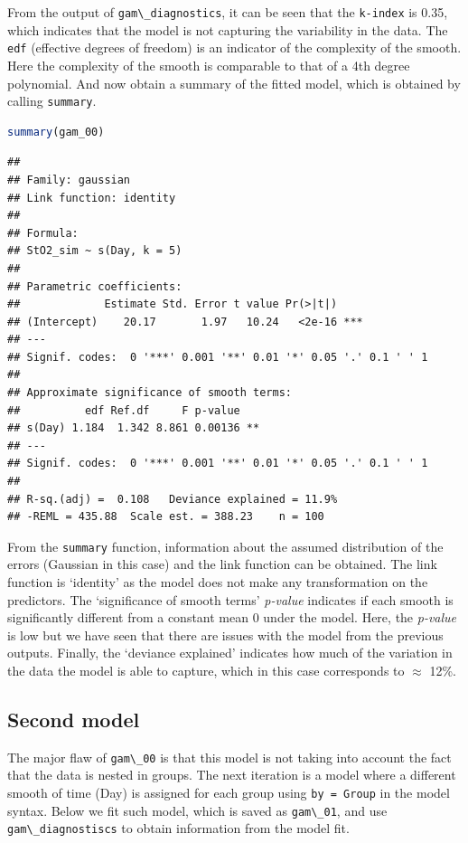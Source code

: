 \documentclass[
]{article}
\newcommand{\passthrough}[1]{#1}
\begin{document}
From the output of \passthrough{\lstinline!gam\_diagnostics!}, it can be seen that the \passthrough{\lstinline!k-index!} is 0.35, which indicates that the model is not capturing the variability in the data. The \passthrough{\lstinline!edf!} (effective degrees of freedom) is an indicator of the complexity of the smooth. Here the complexity of the smooth is comparable to that of a 4th degree polynomial. And now obtain a summary of the fitted model, which is obtained by calling \passthrough{\lstinline!summary!}.

\begin{lstlisting}[language=R]
summary(gam_00)
\end{lstlisting}

\begin{lstlisting}
## 
## Family: gaussian 
## Link function: identity 
## 
## Formula:
## StO2_sim ~ s(Day, k = 5)
## 
## Parametric coefficients:
##             Estimate Std. Error t value Pr(>|t|)    
## (Intercept)    20.17       1.97   10.24   <2e-16 ***
## ---
## Signif. codes:  0 '***' 0.001 '**' 0.01 '*' 0.05 '.' 0.1 ' ' 1
## 
## Approximate significance of smooth terms:
##          edf Ref.df     F p-value   
## s(Day) 1.184  1.342 8.861 0.00136 **
## ---
## Signif. codes:  0 '***' 0.001 '**' 0.01 '*' 0.05 '.' 0.1 ' ' 1
## 
## R-sq.(adj) =  0.108   Deviance explained = 11.9%
## -REML = 435.88  Scale est. = 388.23    n = 100
\end{lstlisting}

From the \passthrough{\lstinline!summary!} function, information about the assumed distribution of the errors (Gaussian in this case) and the link function can be obtained. The link function is `identity' as the model does not make any transformation on the predictors. The `significance of smooth terms' \emph{p-value} indicates if each smooth is significantly different from a constant mean 0 under the model. Here, the \emph{p-value} is low but we have seen that there are issues with the model from the previous outputs. Finally, the `deviance explained' indicates how much of the variation in the data the model is able to capture, which in this case corresponds to \(\approx\) 12\%.

\hypertarget{second-model}{%
\subsection{Second model}\label{second-model}}

The major flaw of \passthrough{\lstinline!gam\_00!} is that this model is not taking into account the fact that the data is nested in groups. The next iteration is a model where a different smooth of time (Day) is assigned for each group using \passthrough{\lstinline!by = Group!} in the model syntax. Below we fit such model, which is saved as \passthrough{\lstinline!gam\_01!}, and use \passthrough{\lstinline!gam\_diagnostiscs!} to obtain information from the model fit.
\end{document}
